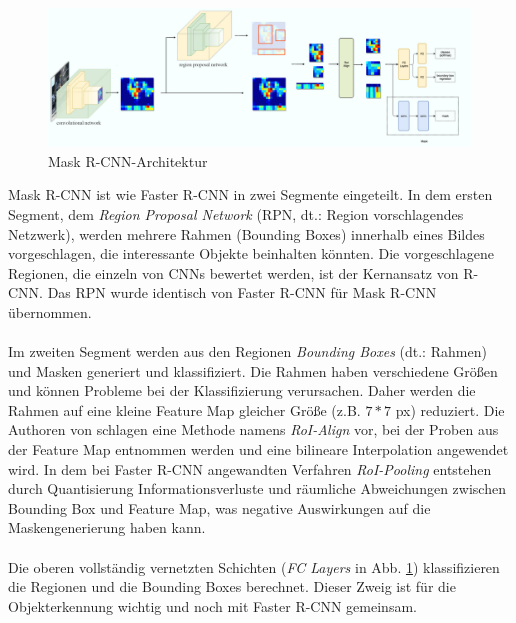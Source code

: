 \begin{figure}[ht]
  \centering
  \includegraphics[width=\textwidth]{pics/maskrcnn-archtecture.PNG}
  \caption[Mask R-CNN-Architektur]{Mask R-CNN-Architektur\cite{ref:mask-rcnn-architecture}}
  \label{fig:maskrcnn-architecture}
\end{figure}

\noindent
Mask R-CNN ist wie Faster R-CNN in zwei Segmente eingeteilt. In dem ersten Segment, dem \textit{Region Proposal Network} (RPN, dt.: Region vorschlagendes Netzwerk), werden mehrere Rahmen (Bounding Boxes) innerhalb eines Bildes vorgeschlagen, die interessante Objekte beinhalten könnten.\cite{ref:faster-r-cnn} Die vorgeschlagene Regionen, die einzeln von CNNs bewertet werden, ist der Kernansatz von R-CNN. Das RPN wurde identisch von Faster R-CNN für Mask R-CNN übernommen.\cite{ref:maskrcnn} 
\\\\
Im zweiten Segment werden aus den Regionen \textit{Bounding Boxes} (dt.: Rahmen) und Masken generiert und klassifiziert. Die Rahmen haben verschiedene Größen und können Probleme bei der Klassifizierung verursachen. Daher werden die Rahmen auf eine kleine Feature Map gleicher Größe (z.B. $7*7$ px) reduziert. Die Authoren von \cite{ref:maskrcnn} schlagen eine Methode namens \textit{RoI-Align} vor, bei der Proben aus der Feature Map entnommen werden und eine bilineare Interpolation angewendet wird. In dem bei Faster R-CNN angewandten Verfahren \textit{RoI-Pooling} entstehen durch Quantisierung Informationsverluste und räumliche Abweichungen zwischen Bounding Box und Feature Map, was negative Auswirkungen auf die Maskengenerierung haben kann.\cite{ref:maskrcnn}
\\\\
Die oberen vollständig vernetzten Schichten (\textit{FC Layers} in Abb. \ref{fig:maskrcnn-architecture}) klassifizieren die Regionen und die Bounding Boxes berechnet. Dieser Zweig ist für die Objekterkennung wichtig und noch mit Faster R-CNN gemeinsam. 
